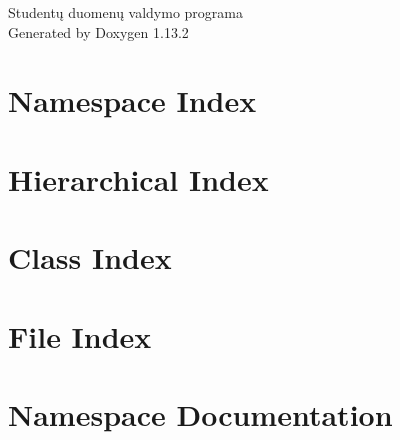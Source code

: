 \documentclass[twoside]{book}
\newcommand{\+}{\discretionary{\mbox{\scriptsize$\hookleftarrow$}}{}{}}
\newcommand{\clearemptydoublepage}{%
    \newpage{\pagestyle{empty}\cleardoublepage}%
  }
\begin{document}
  \raggedbottom
    \hypersetup{pageanchor=false,
                bookmarksnumbered=true,
                pdfencoding=unicode
               }
  \begin{titlepage}
  \vspace*{7cm}
  \begin{center}%
  {\Large Studentų duomenų valdymo programa}\\
  \vspace*{1cm}
  {\large Generated by Doxygen 1.13.2}\\
  \end{center}
  \end{titlepage}
  \clearemptydoublepage
  \tableofcontents
  \clearemptydoublepage
  \hypersetup{pageanchor=true}
\chapter{Namespace Index}

\chapter{Hierarchical Index}

\chapter{Class Index}

\chapter{File Index}

\chapter{Namespace Documentation}















\end{document}
